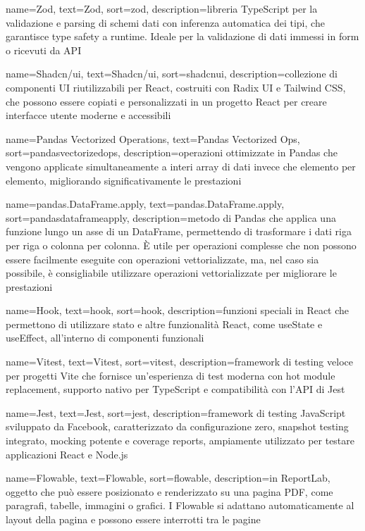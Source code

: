  {
    name=Zod,
    text=Zod,
    sort=zod,
    description={libreria TypeScript per la validazione e parsing di schemi dati con inferenza automatica dei tipi, che garantisce type safety a runtime. Ideale per la validazione di dati immessi in form o ricevuti da API}
}

 {
    name=Shadcn/ui,
    text=Shadcn/ui,
    sort=shadcnui,
    description={collezione di componenti UI riutilizzabili per React, costruiti con Radix UI e Tailwind CSS, che possono essere copiati e personalizzati in un progetto React per creare interfacce utente moderne e accessibili}
}

 {
    name=Pandas Vectorized Operations,
    text=Pandas Vectorized Ops,
    sort=pandasvectorizedops,
    description={operazioni ottimizzate in Pandas che vengono applicate simultaneamente a interi array di dati invece che elemento per elemento, migliorando significativamente le prestazioni}
}

 {
    name=pandas.DataFrame.apply,
    text=pandas.DataFrame.apply,
    sort=pandasdataframeapply,
    description={metodo di Pandas che applica una funzione lungo un asse di un DataFrame, permettendo di trasformare i dati riga per riga o colonna per colonna. È utile per operazioni complesse che non possono essere facilmente eseguite con operazioni vettorializzate, ma, nel caso sia possibile, è consigliabile utilizzare operazioni vettorializzate per migliorare le prestazioni}
}

 {
    name=Hook,
    text=hook,
    sort=hook,
    description={funzioni speciali in React che permettono di utilizzare stato e altre funzionalità React, come useState e useEffect, all'interno di componenti funzionali}
}

 {
    name=Vitest,
    text=Vitest,
    sort=vitest,
    description={framework di testing veloce per progetti Vite che fornisce un'esperienza di test moderna con hot module replacement, supporto nativo per TypeScript e compatibilità con l'API di Jest}
}

 {
    name=Jest,
    text=Jest,
    sort=jest,
    description={framework di testing JavaScript sviluppato da Facebook, caratterizzato da configurazione zero, snapshot testing integrato, mocking potente e coverage reports, ampiamente utilizzato per testare applicazioni React e Node.js}
}

 {
    name=Flowable,
    text=Flowable,
    sort=flowable,
    description={in ReportLab, oggetto che può essere posizionato e renderizzato su una pagina PDF, come paragrafi, tabelle, immagini o grafici. I Flowable si adattano automaticamente al layout della pagina e possono essere interrotti tra le pagine}
}

